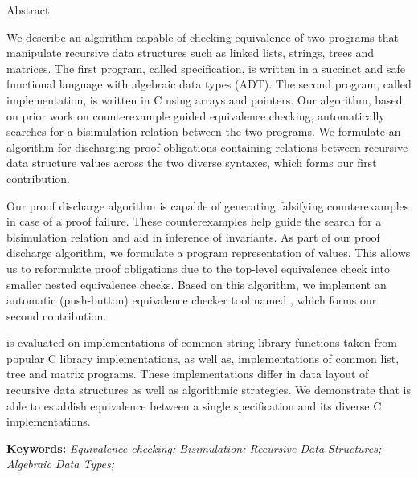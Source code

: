 \begin{center}

\LARGE{Abstract}
\end{center}
We describe an algorithm capable of checking
equivalence of two programs that manipulate recursive
data structures such as linked lists, strings, trees
and matrices. The first program, called specification,
is written in a succinct and safe functional language
with algebraic data types (ADT).
The second program, called implementation,
is written in C using arrays and pointers.
Our algorithm, based on prior work on
counterexample guided equivalence checking,
automatically searches for a bisimulation
relation between the two programs.
We formulate an algorithm for discharging
proof obligations containing relations
between recursive data structure values across
the two diverse syntaxes, which forms our first contribution.

\noindent Our proof discharge algorithm is capable
of generating falsifying counterexamples in case of
a proof failure.
These counterexamples help guide the search for a bisimulation relation
and aid in inference of invariants.
As part of our proof discharge algorithm,
we formulate a program representation of values.
This allows us to reformulate proof obligations
due to the top-level equivalence check
into smaller nested equivalence checks.
Based on this algorithm,
we implement an automatic (push-button) equivalence checker tool named \toolName{},
which forms our second contribution.

\noindent \toolName{} is evaluated on
implementations of common string library
functions taken from popular C library implementations,
as well as,
implementations of common list, tree and matrix programs.
These implementations differ in data layout
of recursive data structures as well as
algorithmic strategies.
We demonstrate that \toolName{} is able to establish equivalence
between a single specification and its diverse C implementations.


\textbf{Keywords:} \textit{Equivalence checking; Bisimulation; Recursive Data Structures; Algebraic Data Types;}

\setlength{\parindent}{1.0em}
